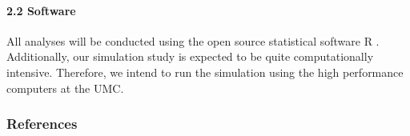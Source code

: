 \documentclass[
  11pt,
]{article}
\begin{document}
\hypertarget{software}{%
\paragraph{\texorpdfstring{2.2\textbar{} Software\\
}{2.2\textbar{} Software }}\label{software}}

\hfill\break
All analyses will be conducted using the open source statistical
software R \autocite{base}. Additionally, our simulation study is
expected to be quite computationally intensive. Therefore, we intend to
run the simulation using the high performance computers at the UMC.

\newpage

\hypertarget{references}{%
\subsubsection{References}\label{references}}

\printbibliography
\end{document}
